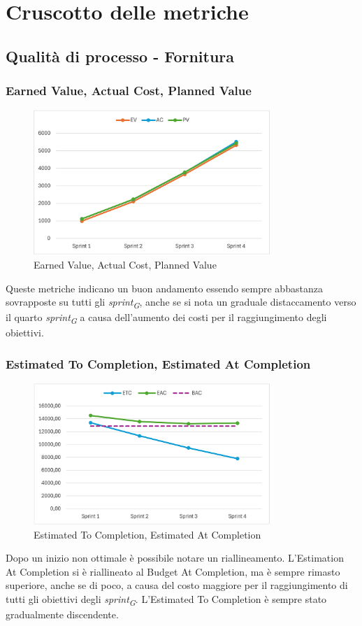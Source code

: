 \section{Cruscotto delle metriche}
\subsection{Qualità di processo - Fornitura}
\subsubsection{Earned Value, Actual Cost, Planned Value}
\begin{figure}[H]
    \centering
    \includegraphics[width=0.8\textwidth]{./images/EV-AC-PV.png}
    \caption{Earned Value, Actual Cost, Planned Value}
\end{figure}
Queste metriche indicano un buon andamento essendo sempre abbastanza sovrapposte su tutti gli \textit{sprint\textsubscript{G}}, anche se si nota un graduale distaccamento verso il quarto \textit{sprint\textsubscript{G}} a causa dell'aumento dei costi per il raggiungimento degli obiettivi.

\subsubsection{Estimated To Completion, Estimated At Completion}
\begin{figure}[H]
    \centering
    \includegraphics[width=0.8\textwidth]{./images/ETC-EAC.png}
    \caption{Estimated To Completion, Estimated At Completion}
\end{figure}
Dopo un inizio non ottimale è possibile notare un riallineamento. L'Estimation At Completion si è riallineato al Budget At Completion, ma è sempre rimasto superiore, anche se di poco, a causa del costo maggiore per il raggiungimento di tutti gli obiettivi degli \textit{sprint\textsubscript{G}}. L'Estimated To Completion è sempre stato gradualmente discendente.


